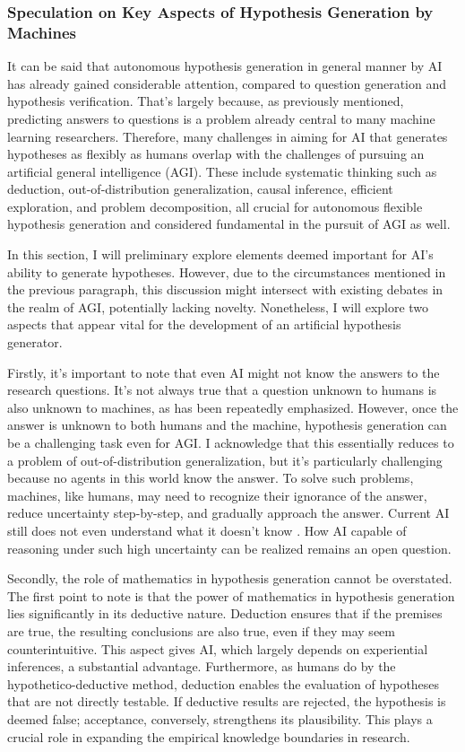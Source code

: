 \subsubsection{Speculation on Key Aspects of Hypothesis Generation by Machines}
It can be said that autonomous hypothesis generation in general manner by AI has already gained considerable attention, compared to question generation and hypothesis verification. That's largely because, as previously mentioned, predicting answers to questions is a problem already central to many machine learning researchers. Therefore, many challenges in aiming for AI that generates hypotheses as flexibly as humans overlap with the challenges of pursuing an artificial general intelligence (AGI). These include systematic thinking such as deduction, out-of-distribution generalization, causal inference, efficient exploration, and problem decomposition, all crucial for autonomous flexible hypothesis generation and considered fundamental in the pursuit of AGI as well.

In this section, I will preliminary explore elements deemed important for AI's ability to generate hypotheses. However, due to the circumstances mentioned in the previous paragraph, this discussion might intersect with existing debates in the realm of AGI, potentially lacking novelty. Nonetheless, I will explore two aspects that appear vital for the development of an artificial hypothesis generator.

Firstly, it's important to note that even AI might not know the answers to the research questions. It's not always true that a question unknown to humans is also unknown to machines, as has been repeatedly emphasized. However, once the answer is unknown to both humans and the machine, hypothesis generation can be a challenging task even for AGI. I acknowledge that this essentially  reduces to a problem of out-of-distribution generalization, but it's particularly challenging because no agents in this world know the answer. To solve such problems, machines, like humans, may need to recognize their ignorance of the answer, reduce uncertainty step-by-step, and gradually approach the answer. Current AI still does not even understand what it doesn't know \cite{guo2017calibration,maynez2020faithfulness}. How AI capable of reasoning under such high uncertainty can be realized remains an open question.

Secondly, the role of mathematics in hypothesis generation cannot be overstated. The first point to note is that the power of mathematics in hypothesis generation lies significantly in its deductive nature. Deduction ensures that if the premises are true, the resulting conclusions are also true, even if they may seem counterintuitive. This aspect gives AI, which largely depends on experiential inferences, a substantial advantage. Furthermore, as humans do by the hypothetico-deductive method, deduction enables the evaluation of hypotheses that are not directly testable. If deductive results are rejected, the hypothesis is deemed false; acceptance, conversely, strengthens its plausibility. This plays a crucial role in expanding the empirical knowledge boundaries in research. 

